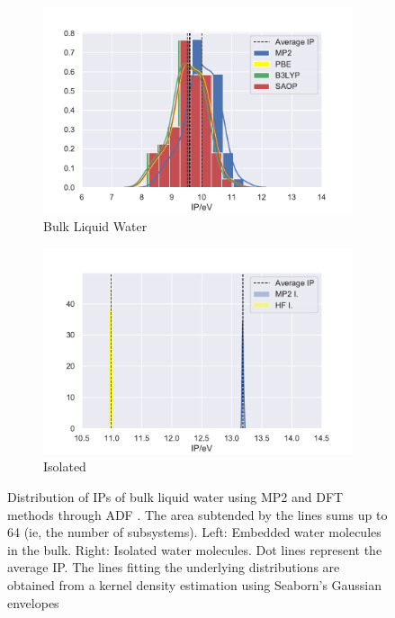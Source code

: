 \documentclass[12pt,a4paper]{article}
\begin{document}
\begin{figure}[!ht]
        \captionsetup[subfigure]{labelformat=empty}
        \centering
        \begin{subfigure}{0.4\linewidth}
                \includegraphics[width=\linewidth]{bulkmp2dft}
                \caption{Bulk Liquid Water}
        \end{subfigure}
        \begin{subfigure}{0.4\linewidth}
                \includegraphics[width=\linewidth]{isomp2dft}
                \caption{Isolated}
        \end{subfigure}
        \caption{Distribution of IPs of bulk liquid water using MP2 and DFT methods through ADF \cite{te2001chemistry}. The area subtended by the lines sums up to 64 (ie, the number of subsystems). Left: Embedded water molecules in the bulk. Right: Isolated water molecules. Dot lines represent the average IP. The lines fitting the underlying distributions are obtained from a kernel density estimation using Seaborn's Gaussian envelopes\cite{waskom2017c}}
\end{figure}
\end{document}
